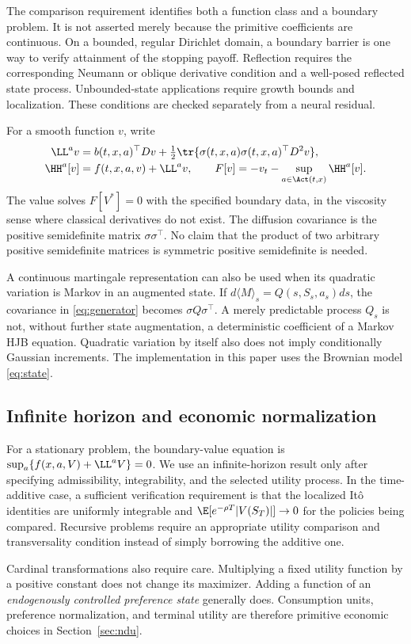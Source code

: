 The comparison requirement identifies both a function class and a boundary problem. It is not asserted merely because the primitive coefficients are continuous. On a bounded, regular Dirichlet domain, a boundary barrier is one way to verify attainment of the stopping payoff. Reflection requires the corresponding Neumann or oblique derivative condition and a well-posed reflected state process. Unbounded-state applications require growth bounds and localization. These conditions are checked separately from a neural residual.

For a smooth function $v$, write
\begin{align}
 \LL^a v&=b(t,x,a)^\top Dv+\tfrac12\tr\{\sigma(t,x,a)\sigma(t,x,a)^\top D^2v\},\label{eq:generator}\\
 \HH^a[v]&=f(t,x,a,v)+\LL^a v,\qquad
 F[v]=-v_t-\sup_{a\in\Act(t,x)}\HH^a[v].\label{eq:hjb}
\end{align}
The value solves $F[V^*]=0$ with the specified boundary data, in the viscosity sense where classical derivatives do not exist. The diffusion covariance is the positive semidefinite matrix $\sigma\sigma^\top$. No claim that the product of two arbitrary positive semidefinite matrices is symmetric positive semidefinite is needed.

A continuous martingale representation can also be used when its quadratic variation is Markov in an augmented state. If $d\langle M\rangle_s=Q(s,S_s,a_s)ds$, the covariance in \eqref{eq:generator} becomes $\sigma Q\sigma^\top$. A merely predictable process $Q_s$ is not, without further state augmentation, a deterministic coefficient of a Markov HJB equation. Quadratic variation by itself also does not imply conditionally Gaussian increments. The implementation in this paper uses the Brownian model \eqref{eq:state}.

\subsection{Infinite horizon and economic normalization}
For a stationary problem, the boundary-value equation is $\sup_a\{f(x,a,V)+\LL^aV\}=0$. We use an infinite-horizon result only after specifying admissibility, integrability, and the selected utility process. In the time-additive case, a sufficient verification requirement is that the localized It\^o identities are uniformly integrable and $\E[e^{-\rho T}|V(S_T)|]\to0$ for the policies being compared. Recursive problems require an appropriate utility comparison and transversality condition instead of simply borrowing the additive one.

Cardinal transformations also require care. Multiplying a fixed utility function by a positive constant does not change its maximizer. Adding a function of an \emph{endogenously controlled preference state} generally does. Consumption units, preference normalization, and terminal utility are therefore primitive economic choices in Section~\ref{sec:ndu}.
